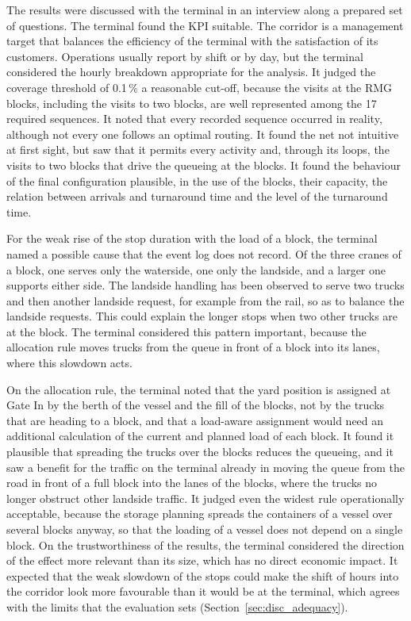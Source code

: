 \begin{revision}
The results were discussed with the terminal in an interview along a prepared set of
questions. The terminal found the KPI suitable. The corridor is a management target
that balances the efficiency of the terminal with the satisfaction of its customers.
Operations usually report by shift or by day, but the terminal considered the hourly
breakdown appropriate for the analysis. It judged the coverage threshold of 0.1\,\% a
reasonable cut-off, because the visits at the RMG blocks, including the visits to two
blocks, are well represented among the 17 required sequences. It noted that every
recorded sequence occurred in reality, although not every one follows an optimal
routing. It found the net not intuitive at first sight, but saw that it permits every
activity and, through its loops, the visits to two blocks that drive the queueing at
the blocks. It found the behaviour of the final configuration plausible, in the use of
the blocks, their capacity, the relation between arrivals and turnaround time and the
level of the turnaround time.

For the weak rise of the stop duration with the load of a block, the terminal named a
possible cause that the event log does not record. Of the three cranes of a block, one
serves only the waterside, one only the landside, and a larger one supports either
side. The landside handling has been observed to serve two trucks and then another
landside request, for example from the rail, so as to balance the landside requests.
This could explain the longer stops when two other trucks are at the block. The
terminal considered this pattern important, because the allocation rule moves trucks
from the queue in front of a block into its lanes, where this slowdown acts.

On the allocation rule, the terminal noted that the yard position is assigned at Gate
In by the berth of the vessel and the fill of the blocks, not by the trucks that are
heading to a block, and that a load-aware assignment would need an additional
calculation of the current and planned load of each block. It found it plausible that
spreading the trucks over the blocks reduces the queueing, and it saw a benefit for
the traffic on the terminal already in moving the queue from the road in front of a
full block into the lanes of the blocks, where the trucks no longer obstruct other
landside traffic. It judged even the widest rule operationally acceptable, because the
storage planning spreads the containers of a vessel over several blocks anyway, so
that the loading of a vessel does not depend on a single block. On the trustworthiness
of the results, the terminal considered the direction of the effect more relevant than
its size, which has no direct economic impact. It expected that the weak slowdown of
the stops could make the shift of hours into the corridor look more favourable than it
would be at the terminal, which agrees with the limits that the evaluation sets
(Section~\ref{sec:disc_adequacy}).
\end{revision}

